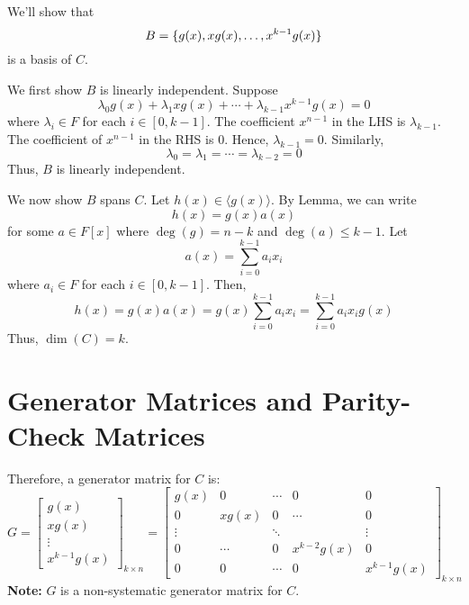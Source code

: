 \begin{Proof}{}{}
    We'll show that
    \[ B=\{g(x),xg(x),\ldots ,x^{k-1}g(x)\} \]
    is a basis of $ C $.

    We first show $ B $ is linearly independent. Suppose
    \[ \lambda_0g(x)+\lambda_1xg(x)+\cdots+\lambda_{k-1}x^{k-1}g(x)=0 \]
    where $ \lambda_i\in F $ for each $ i\in[0,k-1] $.
    The coefficient $ x^{n-1} $ in the LHS
    is $ \lambda_{k-1} $. The coefficient of $ x^{n-1} $ in the RHS is $ 0 $.
    Hence, $ \lambda_{k-1}=0 $. Similarly,
    \[ \lambda_0=\lambda_1=\cdots=\lambda_{k-2}=0 \]
    Thus, $ B $ is linearly independent.

    We now show $ B $ spans $ C $. Let $ h(x)\in \langle g(x)\rangle $.
    By Lemma, we can write
    \[ h(x)=g(x)a(x) \]
    for some $ a\in F[x] $ where $ \deg(g)=n-k $ and $ \deg(a)\leqslant k-1 $. Let
    \[ a(x)=\sum\limits_{i=0}^{k-1} a_i x_i \]
    where $ a_i\in F $ for each $ i\in[0,k-1] $. Then,
    \[ h(x)=g(x)a(x)=g(x)\sum\limits_{i=0}^{k-1} a_i x_i=
        \sum\limits_{i=0}^{k-1} a_i x_i g(x) \]
    Thus, $ \dim(C)=k $.
\end{Proof}

\section{Generator Matrices and Parity-Check Matrices}

Therefore, a generator matrix for $ C $ is:
\[ G
    =
    \begin{bmatrix}
        g(x)   \\
        xg(x)  \\
        \vdots \\
        x^{k-1}g(x)
    \end{bmatrix}_{k\times n}
    =
    \begin{bmatrix}
        g(x)   & 0      & \cdots & 0           & 0           \\
        0      & xg(x)  & 0      & \cdots      & 0           \\
        \vdots &        & \ddots &             & \vdots      \\
        0      & \cdots & 0      & x^{k-2}g(x) & 0           \\
        0      & 0      & \cdots & 0           & x^{k-1}g(x)
    \end{bmatrix}_{k\times n}
\]
\textbf{Note:} $ G $ is a non-systematic generator matrix for $ C $.

